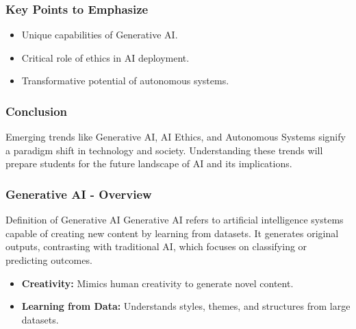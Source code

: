 \documentclass[aspectratio=169]{beamer}
\begin{document}
\begin{frame}[fragile]
    \frametitle{Key Points to Emphasize}
    \begin{itemize}
        \item Unique capabilities of Generative AI.
        \item Critical role of ethics in AI deployment.
        \item Transformative potential of autonomous systems.
    \end{itemize}
\end{frame}

\begin{frame}[fragile]
    \frametitle{Conclusion}
    Emerging trends like Generative AI, AI Ethics, and Autonomous Systems signify a paradigm shift in technology and society. Understanding these trends will prepare students for the future landscape of AI and its implications.
\end{frame}

\begin{frame}
    \frametitle{Generative AI - Overview}
    \begin{block}{Definition of Generative AI}
        Generative AI refers to artificial intelligence systems capable of creating new content by learning from datasets. It generates original outputs, contrasting with traditional AI, which focuses on classifying or predicting outcomes.
    \end{block}
    \begin{itemize}
        \item \textbf{Creativity:} Mimics human creativity to generate novel content.
        \item \textbf{Learning from Data:} Understands styles, themes, and structures from large datasets.
    \end{itemize}
\end{frame}
\end{document}
